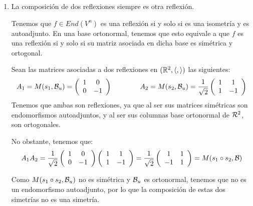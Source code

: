 \begin{ejercicio}
\begin{enumerate}
        \item La composición de dos reflexiones siempre es otra reflexión.

        Tenemos que $f\in End(V^n)$ es una reflexión si y solo si es una isometría y es autoadjunto. En una base ortonormal, tenemos que esto equivale a que $f$ es una reflexión si y solo si su matriz asociada en dicha base es simétrica y ortogonal.

        Sean las matrices asociadas a dos reflexiones en $(\mathbb{R}^2, \langle,\rangle)$ las siguientes:
        \begin{equation*}
            A_1 = M(s_1, \mathcal{B}_u) = \left(\begin{array}{cc}
                1 & 0 \\
                0 & -1
            \end{array}\right)
            \qquad \qquad
            A_2 = M(s_2, \mathcal{B}_u) = \frac{1}{\sqrt{2}}\left(\begin{array}{cc}
                1 & 1 \\
                1 & -1
            \end{array}\right)
        \end{equation*}
        Tenemos que ambas son reflexiones, ya que al ser sus matrices simétricas son endomorfismos autoadjuntos, y al ser sus columnas base ortonormal de $\mathcal{R}^2$, son ortogonales.

        No obstante, tenemos que:
        \begin{equation*}
            A_1A_2 = \frac{1}{\sqrt{2}}\left(\begin{array}{cc}
                1 & 0 \\
                0 & -1
            \end{array}\right)\left(\begin{array}{cc}
                1 & 1 \\
                1 & -1
            \end{array}\right)
            = \frac{1}{\sqrt{2}}\left(\begin{array}{cc}
                1 & 1 \\
                -1 & 1
            \end{array}\right)
            = M(s_1\circ s_2,\mathcal{B})
        \end{equation*}

        Como $M(s_1\circ s_2,\mathcal{B}_u)$ no es simétrica y $\mathcal{B}_u$ es ortonormal, tenemos que no es un endomorfismo autoadjunto, por lo que la composición de estas dos simetrías no es una simetría.


\end{enumerate}
\end{ejercicio}

